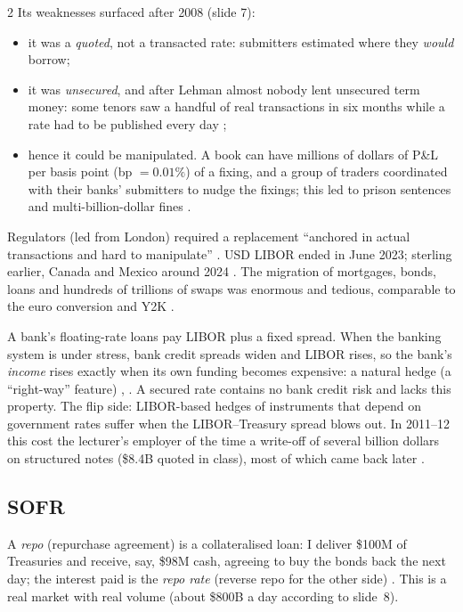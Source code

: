 \begin{paracol}{2}
Its weaknesses surfaced after 2008 (slide 7):
\begin{itemize}
  \item it was a \emph{quoted}, not a transacted rate: submitters estimated where they \emph{would} borrow;
  \item it was \emph{unsecured}, and after Lehman almost nobody lent unsecured term money: some tenors saw a
        handful of real transactions in six months while a rate had to be published every day
        ;
  \item hence it could be manipulated. A book can have millions of dollars of P\&L per basis point
        (bp $=0.01\%$) of a fixing, and a group of traders coordinated with their banks' submitters to nudge the
        fixings; this led to prison sentences and multi-billion-dollar fines .
\end{itemize}
Regulators (led from London) required a replacement ``anchored in actual transactions and hard to
manipulate'' . USD LIBOR ended in June 2023; sterling earlier, Canada and Mexico around 2024
. The migration of mortgages, bonds, loans and hundreds of trillions of swaps was enormous
and tedious, comparable to the euro conversion and Y2K .

\begin{finance}
A bank's floating-rate loans pay LIBOR plus a fixed spread. When the banking system is under stress, bank
credit spreads widen and LIBOR rises, so the bank's \emph{income} rises exactly when its own funding becomes
expensive: a natural hedge (a ``right-way'' feature) , . A secured rate
contains no bank credit risk and lacks this property. The flip side: LIBOR-based hedges of instruments that
depend on government rates suffer when the LIBOR--Treasury spread blows out. In 2011--12 this cost the
lecturer's employer of the time a write-off of several billion dollars on structured notes (\$8.4B quoted in
class), most of which came back later .
\end{finance}

\subsection{SOFR}
A \emph{repo} (repurchase agreement) is a collateralised loan: I deliver \$100M of Treasuries and receive, say,
\$98M cash, agreeing to buy the bonds back the next day; the interest paid is the \emph{repo rate} (reverse
repo for the other side) . This is a real market with real volume (about \$800B a day
according to slide~8).


\end{paracol}
